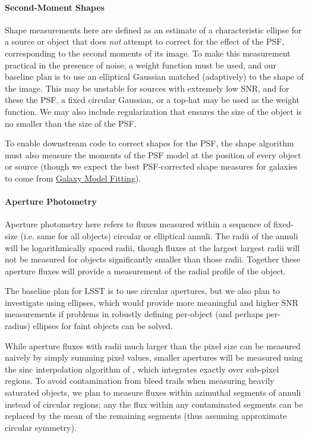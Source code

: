 \paragraph{Second-Moment Shapes}
\label{sec:acShapeAlgorithms}

Shape measurements here are defined as an estimate of a characteristic ellipse for a source or object that does \emph{not} attempt to correct for the effect of the PSF, corresponding to the second moments of its image.  To make this measurement practical in the presence of noise, a weight function must be used, and our baseline plan is to use an elliptical Gaussian matched (adaptively) to the shape of the image.  This may be unstable for sources with extremely low SNR, and for these the PSF, a fixed circular Gaussian, or a top-hat may be used as the weight function.  We may also include regularization that ensures the size of the object is no smaller than the size of the PSF.

To enable downstream code to correct shapes for the PSF, the shape algorithm must also measure the moments of the PSF model at the position of every object or source (though we expect the best PSF-corrected shape measures for galaxies to come from \hyperref[sec:acGalaxyModels]{Galaxy Model Fitting}).

\paragraph{Aperture Photometry}
\label{sec:acAperturePhotometry}

Aperture photometry here refers to fluxes measured within a sequence of fixed-size (i.e. same for all objects) circular or elliptical annuli.  The radii of the annuli will be logarithmically spaced radii, though fluxes at the largest largest radii will not be measured for objects significantly smaller than those radii.  Together these aperture fluxes will provide a measurement of the radial profile of the object.

The baseline plan for LSST is to use circular apertures, but we also plan to investigate using ellipses, which would provide more meaningful and higher SNR measurements if problems in robustly defining per-object (and perhaps per-radius) ellipses for faint objects can be solved.

While aperture fluxes with radii much larger than the pixel size can be measured naively by simply summing pixel values, smaller apertures will be measured using the $\mathrm{sinc}$ interpolation algorithm of \cite{Bickerton13}, which integrates exactly over sub-pixel regions.  To avoid contamination from bleed trails when measuring heavily saturated objects, we plan to measure fluxes within azimuthal segments of annuli instead of circular regions; any the flux within any contaminated segments can be replaced by the mean of the remaining segments (thus assuming approximate circular symmetry).

